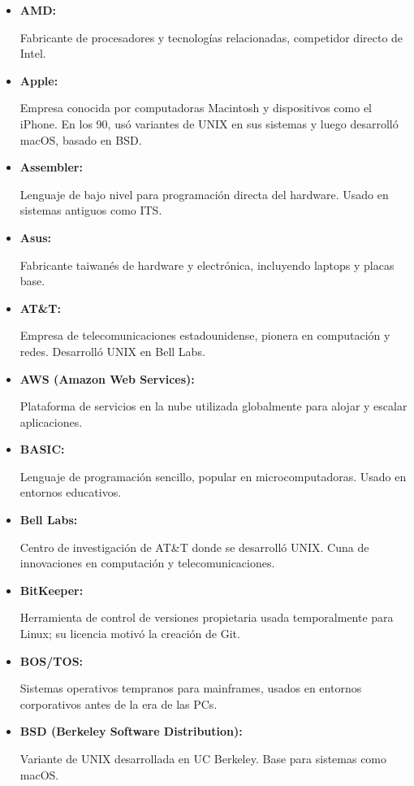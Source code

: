 \documentclass[a4paper,12pt]{article}
\begin{document}
\begin{itemize} \item \hypertarget{amd}{\textbf{AMD:}} Fabricante de
procesadores y tecnologías relacionadas, competidor directo de Intel.
\label{amd}

\item \hypertarget{apple}{\textbf{Apple:}} Empresa conocida por computadoras
Macintosh y dispositivos como el iPhone. En los 90, usó variantes de UNIX en sus
sistemas y luego desarrolló macOS, basado en BSD.  \label{apple}

\item \hypertarget{assembler}{\textbf{Assembler:}} Lenguaje de bajo nivel para
programación directa del hardware. Usado en sistemas antiguos como ITS.
\label{assembler}

\item \hypertarget{asus}{\textbf{Asus:}} Fabricante taiwanés de hardware y
electrónica, incluyendo laptops y placas base.  \label{asus}

\item \hypertarget{att}{\textbf{AT\&T:}} Empresa de telecomunicaciones
estadounidense, pionera en computación y redes. Desarrolló UNIX en Bell Labs.
\label{att}

\item \hypertarget{aws}{\textbf{AWS (Amazon Web Services):}} Plataforma de
servicios en la nube utilizada globalmente para alojar y escalar aplicaciones.
\label{aws}

\item \hypertarget{basic}{\textbf{BASIC:}} Lenguaje de programación sencillo,
popular en microcomputadoras. Usado en entornos educativos.  \label{basic}

\item \hypertarget{belllabs}{\textbf{Bell Labs:}} Centro de investigación de
AT\&T donde se desarrolló UNIX. Cuna de innovaciones en computación y
telecomunicaciones.  \label{belllabs}

\item \hypertarget{bitkeeper}{\textbf{BitKeeper:}} Herramienta de control de
versiones propietaria usada temporalmente para Linux; su licencia motivó la
creación de Git.  \label{bitkeeper}

\item \hypertarget{bostos}{\textbf{BOS/TOS:}} Sistemas operativos tempranos para
mainframes, usados en entornos corporativos antes de la era de las PCs.
\label{bostos}

\item \hypertarget{bsd}{\textbf{BSD (Berkeley Software Distribution):}} Variante
de UNIX desarrollada en UC Berkeley. Base para sistemas como macOS.  \label{bsd}


\end{itemize}
\end{document}

